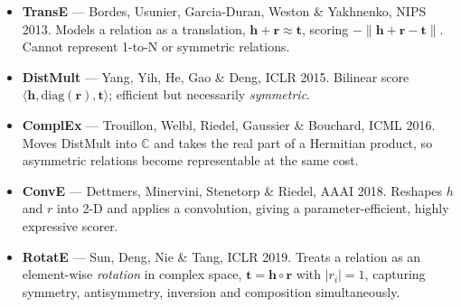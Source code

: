 \begin{itemize}\itemsep2pt
\item \textbf{TransE} --- Bordes, Usunier, Garcia-Duran, Weston \& Yakhnenko, NIPS 2013. Models a
  relation as a translation, $\mathbf{h}+\mathbf{r}\approx\mathbf{t}$, scoring
  $-\|\mathbf{h}+\mathbf{r}-\mathbf{t}\|$. Cannot represent 1-to-N or symmetric relations.
\item \textbf{DistMult} --- Yang, Yih, He, Gao \& Deng, ICLR 2015. Bilinear score
  $\langle\mathbf{h},\mathrm{diag}(\mathbf{r}),\mathbf{t}\rangle$; efficient but necessarily
  \emph{symmetric}.
\item \textbf{ComplEx} --- Trouillon, Welbl, Riedel, Gaussier \& Bouchard, ICML 2016. Moves
  DistMult into $\mathbb{C}$ and takes the real part of a Hermitian product, so asymmetric
  relations become representable at the same cost.
\item \textbf{ConvE} --- Dettmers, Minervini, Stenetorp \& Riedel, AAAI 2018. Reshapes $h$ and $r$
  into 2-D and applies a convolution, giving a parameter-efficient, highly expressive scorer.
\item \textbf{RotatE} --- Sun, Deng, Nie \& Tang, ICLR 2019. Treats a relation as an element-wise
  \emph{rotation} in complex space, $\mathbf{t}=\mathbf{h}\circ\mathbf{r}$ with
  $|r_i|=1$, capturing symmetry, antisymmetry, inversion and composition simultaneously.
\end{itemize}

